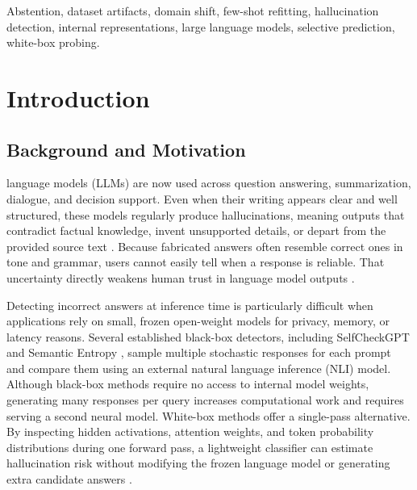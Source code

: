 \documentclass{ieeeaccess}
\begin{document}
\begin{keywords}
Abstention, dataset artifacts, domain shift, few-shot refitting, hallucination detection, internal representations, large language models, selective prediction, white-box probing.
\end{keywords}

\titlepgskip=-21pt

\maketitle

\section{Introduction}
\label{sec:introduction}

\subsection{Background and Motivation}
 language models (LLMs) are now used across question answering, summarization, dialogue, and decision support. Even when their writing appears clear and well structured, these models regularly produce hallucinations, meaning outputs that contradict factual knowledge, invent unsupported details, or depart from the provided source text \cite{review35,review18}. Because fabricated answers often resemble correct ones in tone and grammar, users cannot easily tell when a response is reliable. That uncertainty directly weakens human trust in language model outputs \cite{review19,review03}.

Detecting incorrect answers at inference time is particularly difficult when applications rely on small, frozen open-weight models for privacy, memory, or latency reasons. Several established black-box detectors, including SelfCheckGPT \cite{review21} and Semantic Entropy \cite{kuhn2023semantic,farquhar2024detecting}, sample multiple stochastic responses for each prompt and compare them using an external natural language inference (NLI) model. Although black-box methods require no access to internal model weights, generating many responses per query increases computational work and requires serving a second neural model. White-box methods offer a single-pass alternative. By inspecting hidden activations, attention weights, and token probability distributions during one forward pass, a lightweight classifier can estimate hallucination risk without modifying the frozen language model or generating extra candidate answers \cite{review27,review01,review12}.
\end{document}
